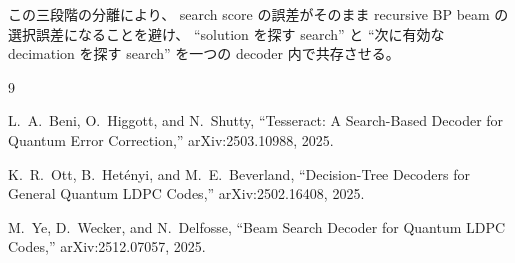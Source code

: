 この三段階の分離により、
search score の誤差がそのまま recursive BP beam の選択誤差になることを避け、
``solution を探す search'' と
``次に有効な decimation を探す search''
を一つの decoder 内で共存させる。


\begin{thebibliography}{9}

L.~A.~Beni, O.~Higgott, and N.~Shutty,
``Tesseract: A Search-Based Decoder for Quantum Error Correction,''
arXiv:2503.10988, 2025.

K.~R.~Ott, B.~Het\'enyi, and M.~E.~Beverland,
``Decision-Tree Decoders for General Quantum LDPC Codes,''
arXiv:2502.16408, 2025.

M.~Ye, D.~Wecker, and N.~Delfosse,
``Beam Search Decoder for Quantum LDPC Codes,''
arXiv:2512.07057, 2025.

\end{thebibliography}